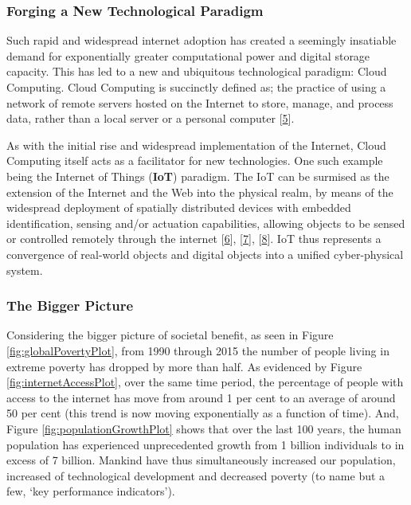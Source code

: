\documentclass[11pt,]{article}
\begin{document}
\hypertarget{forging-a-new-technological-paradigm}{%
\subsubsection{Forging a New Technological
Paradigm}\label{forging-a-new-technological-paradigm}}

Such rapid and widespread internet adoption has created a seemingly
insatiable demand for exponentially greater computational power and
digital storage capacity. This has led to a new and ubiquitous
technological paradigm: Cloud Computing. Cloud Computing is succinctly
defined as; the practice of using a network of remote servers hosted on
the Internet to store, manage, and process data, rather than a local
server or a personal computer
{[}\protect\hyperlink{ref-CloudComputingDefinition}{5}{]}.

As with the initial rise and widespread implementation of the Internet,
Cloud Computing itself acts as a facilitator for new technologies. One
such example being the Internet of Things (\textbf{IoT}) paradigm. The
IoT can be surmised as the extension of the Internet and the Web into
the physical realm, by means of the widespread deployment of spatially
distributed devices with embedded identification, sensing and/or
actuation capabilities, allowing objects to be sensed or controlled
remotely through the internet
{[}\protect\hyperlink{ref-danielemiorandiInternetThingsVision2012}{6}{]},
{[}\protect\hyperlink{ref-binghuangServiceOrientedComputing16th2018}{7}{]},
{[}\protect\hyperlink{ref-luigiatzoriInternetThingsSurvey2010}{8}{]}.
IoT thus represents a convergence of real-world objects and digital
objects into a unified cyber-physical system.

\hypertarget{the-bigger-picture}{%
\subsubsection{The Bigger Picture}\label{the-bigger-picture}}

Considering the bigger picture of societal benefit, as seen in Figure
\ref{fig:globalPovertyPlot}, from 1990 through 2015 the number of people
living in extreme poverty has dropped by more than half. As evidenced by
Figure \ref{fig:internetAccessPlot}, over the same time period, the
percentage of people with access to the internet has move from around 1
per cent to an average of around 50 per cent (this trend is now moving
exponentially as a function of time). And, Figure
\ref{fig:populationGrowthPlot} shows that over the last 100 years, the
human population has experienced unprecedented growth from 1 billion
individuals to in excess of 7 billion. Mankind have thus simultaneously
increased our population, increased of technological development and
decreased poverty (to name but a few, `key performance indicators').
\end{document}
